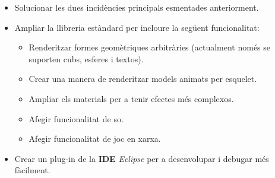 \begin{itemize}
  \item Solucionar les dues incidències principals esmentades anteriorment.
  \item Ampliar la llibreria estàndard per incloure la següent funcionalitat:
  \begin{itemize}
    \item Renderitzar formes geomètriques arbitràries (actualment només se suporten cubs, esferes i textos).
    \item Crear una manera de renderitzar models animats per esquelet.
    \item Ampliar els materials per a tenir efectes més complexos.
    \item Afegir funcionalitat de so.
    \item Afegir funcionalitat de joc en xarxa.
  \end{itemize}
  \item Crear un plug-in de la {\bf IDE} {\em Eclipse} per a desenvolupar i debugar més fàcilment.
\end{itemize}